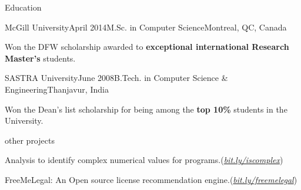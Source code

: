 \documentclass{resume} %
\begin{document}
 
\begin{rSection}{Education}

\begin{rSubsection}{McGill University}{April 2014}{M.Sc. in
Computer Science}{Montreal, QC, Canada} 
\item Won the DFW scholarship awarded to \textbf{exceptional international
        Research Master's} students.
\end{rSubsection}

\begin{rSubsection}{SASTRA University}{June 2008}{B.Tech. in Computer Science
\& Engineering}{Thanjavur, India} 
\item Won the {Dean's list scholarship} for being among the \textbf{top
10\%} students in the University. 
\end{rSubsection}

\end{rSection}

\begin{rSection}{other projects}\smallskip \begin{lSubsection}
%
\item Analysis to identify complex numerical values for \matlab
        programs.(\href{http://bit.ly/iscomplex}{\em{bit.ly/iscomplex}}) 

\item FreeMeLegal: An Open source license recommendation
engine.(\href{http://bit.ly/freemelegal}{\em{bit.ly/freemelegal}}) 
\end{lSubsection}
\end{rSection}

\end{document}
